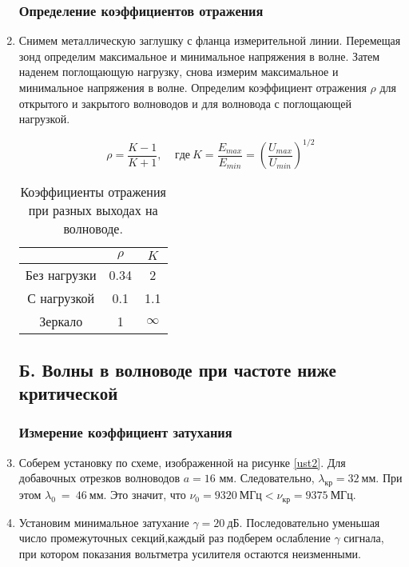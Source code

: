 \documentclass{lab}
\begin{document}
\begin{enumerate}
\subsubsection*{Определение коэффициентов отражения}

\item Снимем металлическую заглушку с фланца измерительной линии. Перемещая зонд определим
максимальное и минимальное напряжения в волне. Затем наденем поглощающую нагрузку, снова
измерим максимальное и минимальное напряжения в волне. Определим коэффициент отражения
$ \rho $ для открытого и закрытого волноводов и для волновода с поглощающей нагрузкой.

$$ \rho = \dfrac{K-1}{K+1},~~~~~ где ~ K = \dfrac{E_{max}}{E_{min}} =
\left( \dfrac{U_{max}}{U_{min}} \right)^{1/2} $$

\begin{table}[H]
	\centering
	\begin{tabular}{|c|cc|}
		\hline
					&\hspace*{0.5cm} $ \rho $ \hspace*{0.5cm}	&\hspace*{0.5cm} $ K $ \hspace*{0.5cm}		\\ \hline
		Без нагрузки&0.34		&2			\\
		С нагрузкой	&0.1		&1.1		\\
		Зеркало		&1			&$\infty$	\\ \hline
	\end{tabular}
\caption{\footnotesize
	Коэффициенты отражения при разных выходах на волноводе.
}
	\label{tabrho}
\end{table}

\subsection*{Б. Волны в волноводе при частоте ниже критической}
\subsubsection*{Измерение коэффициент затухания}

\item Соберем установку по схеме, изображенной на рисунке \ref{ust2}. Для добавочных
отрезков волноводов $ a = 16 $ мм. Следовательно, $ \lambda_{кр} = 32~мм $. При этом
$ \lambda_0~=~46~мм $. Это значит, что $ \nu_0 = 9320~МГц < \nu_{кр} = 9375~МГц $.

\item Установим минимальное затухание $ \gamma = 20~дБ $. Последовательно уменьшая
число промежуточных секций,каждый раз подберем ослабление $ \gamma $ сигнала, при
котором показания вольтметра усилителя остаются неизменными.


\end{enumerate}
\end{document}
